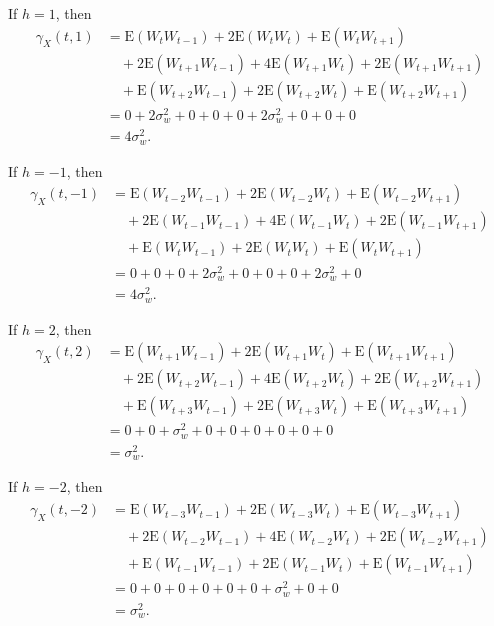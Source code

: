 \documentclass[
  10pt,
]{extarticle}
\begin{document}
If \(h=1\), then
\[
\begin{aligned}
\gamma_X(t,1)
&= \mathrm{E}(W_tW_{t-1})
 + 2\mathrm{E}(W_tW_t)
 + \mathrm{E}(W_tW_{t+1}) \\
&\quad + 2\mathrm{E}(W_{t+1}W_{t-1})
 + 4\mathrm{E}(W_{t+1}W_t)
 + 2\mathrm{E}(W_{t+1}W_{t+1}) \\
&\quad + \mathrm{E}(W_{t+2}W_{t-1})
 + 2\mathrm{E}(W_{t+2}W_t)
 + \mathrm{E}(W_{t+2}W_{t+1}) \\
&= 0 + 2\sigma_w^2 + 0 + 0 + 0 + 2\sigma_w^2 + 0 + 0 + 0 \\
&= 4\sigma_w^2.
\end{aligned}
\]

If \(h=-1\), then
\[
\begin{aligned}
\gamma_X(t,-1)
&= \mathrm{E}(W_{t-2}W_{t-1})
 + 2\mathrm{E}(W_{t-2}W_t)
 + \mathrm{E}(W_{t-2}W_{t+1}) \\
&\quad + 2\mathrm{E}(W_{t-1}W_{t-1})
 + 4\mathrm{E}(W_{t-1}W_t)
 + 2\mathrm{E}(W_{t-1}W_{t+1}) \\
&\quad + \mathrm{E}(W_tW_{t-1})
 + 2\mathrm{E}(W_tW_t)
 + \mathrm{E}(W_tW_{t+1}) \\
&= 0 + 0 + 0 + 2\sigma_w^2 + 0 + 0 + 0 + 2\sigma_w^2 + 0 \\
&= 4\sigma_w^2.
\end{aligned}
\]

If \(h=2\), then
\[
\begin{aligned}
\gamma_X(t,2)
&= \mathrm{E}(W_{t+1}W_{t-1})
 + 2\mathrm{E}(W_{t+1}W_t)
 + \mathrm{E}(W_{t+1}W_{t+1}) \\
&\quad + 2\mathrm{E}(W_{t+2}W_{t-1})
 + 4\mathrm{E}(W_{t+2}W_t)
 + 2\mathrm{E}(W_{t+2}W_{t+1}) \\
&\quad + \mathrm{E}(W_{t+3}W_{t-1})
 + 2\mathrm{E}(W_{t+3}W_t)
 + \mathrm{E}(W_{t+3}W_{t+1}) \\
&= 0 + 0 + \sigma_w^2 + 0 + 0 + 0 + 0 + 0 + 0 \\
&= \sigma_w^2.
\end{aligned}
\]

If \(h=-2\), then
\[
\begin{aligned}
\gamma_X(t,-2)
&= \mathrm{E}(W_{t-3}W_{t-1})
 + 2\mathrm{E}(W_{t-3}W_t)
 + \mathrm{E}(W_{t-3}W_{t+1}) \\
&\quad + 2\mathrm{E}(W_{t-2}W_{t-1})
 + 4\mathrm{E}(W_{t-2}W_t)
 + 2\mathrm{E}(W_{t-2}W_{t+1}) \\
&\quad + \mathrm{E}(W_{t-1}W_{t-1})
 + 2\mathrm{E}(W_{t-1}W_t)
 + \mathrm{E}(W_{t-1}W_{t+1}) \\
&= 0 + 0 + 0 + 0 + 0 + 0 + \sigma_w^2 + 0 + 0 \\
&= \sigma_w^2.
\end{aligned}
\]
\end{document}
